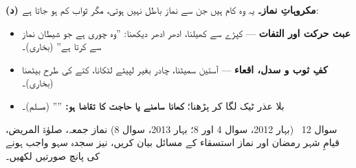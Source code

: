 \begin{hal}
\medskip
\textbf{(د) مکروہاتِ نماز۔} یہ وہ کام ہیں جن سے نماز باطل نہیں ہوتی، مگر ثواب
کم ہو جاتا ہے:

\begin{itemize}\setlength{\itemsep}{1pt}
  \item \textbf{عبث حرکت اور التفات} --- کپڑے سے کھیلنا، ادھر ادھر دیکھنا:
        ''وہ چوری ہے جو شیطان نماز سے کرتا ہے'' (بخاری)۔
  \item \textbf{کفِ ثوب و سدل، اقعاء} --- آستین سمیٹنا، چادر بغیر لپیٹے
        لٹکانا، کتے کی طرح بیٹھنا (بخاری)۔
  \item بلا عذر ٹیک لگا کر پڑھنا؛ \textbf{کھانا سامنے یا حاجت کا تقاضا ہو:}
        '''' (مسلم)۔
\end{itemize}
\end{hal}

\begin{sawal}{سوال \textenglish{12} \ \textnormal{\small(بہار \textenglish{2012}، سوال \textenglish{4} اور \textenglish{8}؛ بہار \textenglish{2013}، سوال \textenglish{8})}}
نماز جمعہ، صلوٰۃ المریض، قیامِ شہر رمضان اور نماز استسقاء کے مسائل بیان کریں،
نیز سجدہ سہو واجب ہونے کی پانچ صورتیں لکھیں۔
\end{sawal}

